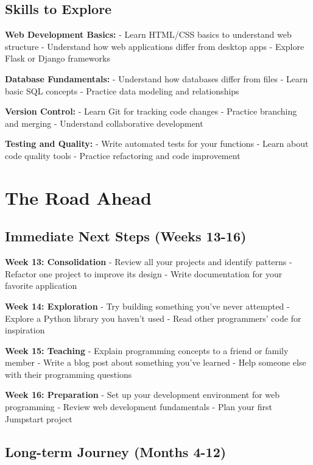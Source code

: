 \documentclass[
  letterpaper,
  DIV=11,
  numbers=noendperiod,
  oneside]{scrreprt}
\begin{document}
\subsection{Skills to Explore}\label{skills-to-explore}

\textbf{Web Development Basics:} - Learn HTML/CSS basics to understand
web structure - Understand how web applications differ from desktop apps
- Explore Flask or Django frameworks

\textbf{Database Fundamentals:} - Understand how databases differ from
files - Learn basic SQL concepts - Practice data modeling and
relationships

\textbf{Version Control:} - Learn Git for tracking code changes -
Practice branching and merging - Understand collaborative development

\textbf{Testing and Quality:} - Write automated tests for your functions
- Learn about code quality tools - Practice refactoring and code
improvement

\section{The Road Ahead}\label{the-road-ahead}

\subsection{Immediate Next Steps (Weeks
13-16)}\label{immediate-next-steps-weeks-13-16}

\textbf{Week 13: Consolidation} - Review all your projects and identify
patterns - Refactor one project to improve its design - Write
documentation for your favorite application

\textbf{Week 14: Exploration} - Try building something you've never
attempted - Explore a Python library you haven't used - Read other
programmers' code for inspiration

\textbf{Week 15: Teaching} - Explain programming concepts to a friend or
family member - Write a blog post about something you've learned - Help
someone else with their programming questions

\textbf{Week 16: Preparation} - Set up your development environment for
web programming - Review web development fundamentals - Plan your first
Jumpstart project

\subsection{Long-term Journey (Months
4-12)}\label{long-term-journey-months-4-12}
\end{document}
